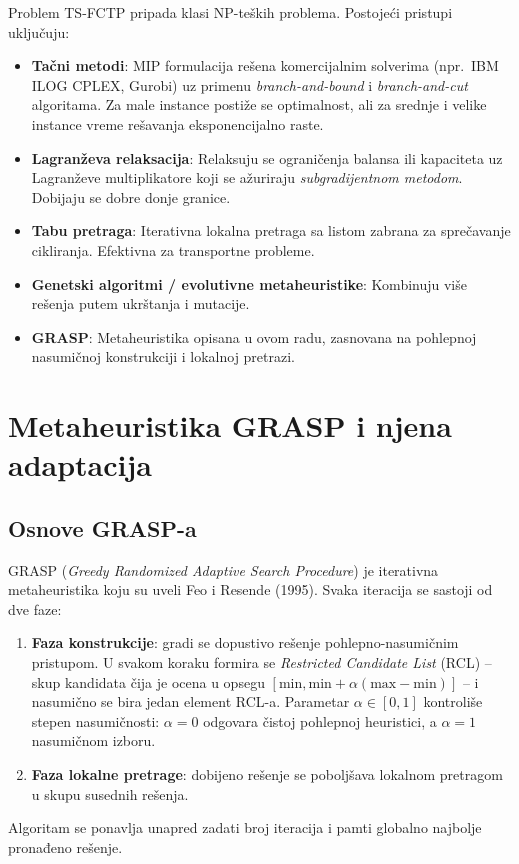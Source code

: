\documentclass[12pt,a4paper]{article}
\begin{document}
Problem TS-FCTP pripada klasi NP-teških problema. Postojeći pristupi
uključuju:
\begin{itemize}
  \item \textbf{Tačni metodi}: MIP formulacija rešena komercijalnim
    solverima (npr.\ IBM ILOG CPLEX, Gurobi) uz primenu \textit{branch-and-bound}
    i \textit{branch-and-cut} algoritama. Za male instance postiže se
    optimalnost, ali za srednje i velike instance vreme rešavanja
    eksponencijalno raste.
  \item \textbf{Lagranževa relaksacija}: Relaksuju se ograničenja balansa
    ili kapaciteta uz Lagranževe multiplikatore koji se ažuriraju
    \textit{subgradijentnom metodom}. Dobijaju se dobre donje granice.
  \item \textbf{Tabu pretraga}: Iterativna lokalna pretraga sa listom
    zabrana za sprečavanje cikliranja. Efektivna za transportne probleme.
  \item \textbf{Genetski algoritmi / evolutivne metaheuristike}: Kombinuju
    više rešenja putem ukrštanja i mutacije.
  \item \textbf{GRASP}: Metaheuristika opisana u ovom radu, zasnovana na
    pohlepnoj nasumičnoj konstrukciji i lokalnoj pretrazi.
\end{itemize}

\section{Metaheuristika GRASP i njena adaptacija}

\subsection{Osnove GRASP-a}

GRASP (\textit{Greedy Randomized Adaptive Search Procedure}) je
iterativna metaheuristika koju su uveli Feo i Resende (1995).
Svaka iteracija se sastoji od dve faze:
\begin{enumerate}
  \item \textbf{Faza konstrukcije}: gradi se dopustivo rešenje pohlepno-nasumičnim
    pristupom. U svakom koraku formira se \textit{Restricted Candidate List}
    (RCL) -- skup kandidata čija je ocena u opsegu
    $[\text{min}, \text{min} + \alpha(\text{max}-\text{min})]$ --
    i nasumično se bira jedan element RCL-a.
    Parametar $\alpha \in [0,1]$ kontroliše stepen nasumičnosti:
    $\alpha=0$ odgovara čistoj pohlepnoj heuristici, a $\alpha=1$ nasumičnom izboru.
  \item \textbf{Faza lokalne pretrage}: dobijeno rešenje se poboljšava
    lokalnom pretragom u skupu susednih rešenja.
\end{enumerate}
Algoritam se ponavlja unapred zadati broj iteracija i pamti globalno
najbolje pronađeno rešenje.
\end{document}
